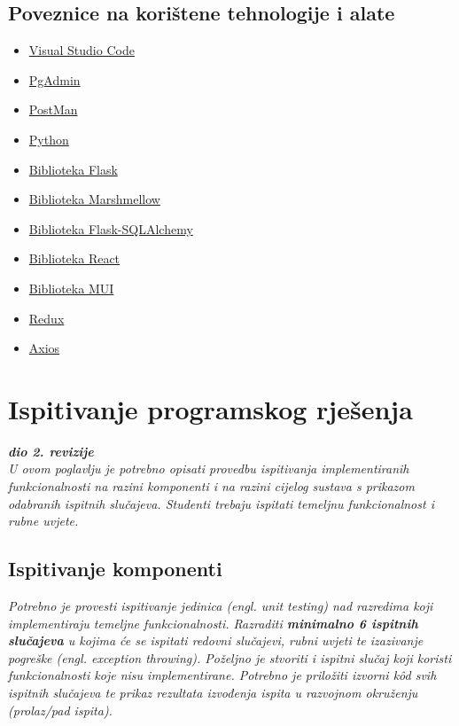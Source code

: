             \subsection{Poveznice na korištene tehnologije i alate}
            \begin{itemize}
                \item \href{https://code.visualstudio.com/}{Visual Studio Code}
                \item \href{https://www.pgadmin.org/}{PgAdmin}
                \item \href{https://www.postman.com/}{PostMan}
                \item \href{https://www.python.org/}{Python}
                \item \href{https://flask.palletsprojects.com/en/3.0.x/}{Biblioteka Flask}
                \item \href{https://marshmallow.readthedocs.io/en/stable/}{Biblioteka Marshmellow}
                \item \href{https://flask-sqlalchemy.palletsprojects.com/en/3.1.x/}{Biblioteka Flask-SQLAlchemy}
                \item \href{https://react.dev/}{Biblioteka React}
                \item \href{https://mui.com/}{Biblioteka MUI}
                \item \href{https://redux.js.org/}{Redux}
                \item \href{https://axios-http.com/docs/intro}{Axios}
              \end{itemize}
			\eject 
		
	
		\section{Ispitivanje programskog rješenja}
			
			\textbf{\textit{dio 2. revizije}}\\
			
			 \textit{U ovom poglavlju je potrebno opisati provedbu ispitivanja implementiranih funkcionalnosti na razini komponenti i na razini cijelog sustava s prikazom odabranih ispitnih slučajeva. Studenti trebaju ispitati temeljnu funkcionalnost i rubne uvjete.}
	
			
			\subsection{Ispitivanje komponenti}
			\textit{Potrebno je provesti ispitivanje jedinica (engl. unit testing) nad razredima koji implementiraju temeljne funkcionalnosti. Razraditi \textbf{minimalno 6 ispitnih slučajeva} u kojima će se ispitati redovni slučajevi, rubni uvjeti te izazivanje pogreške (engl. exception throwing). Poželjno je stvoriti i ispitni slučaj koji koristi funkcionalnosti koje nisu implementirane. Potrebno je priložiti izvorni kôd svih ispitnih slučajeva te prikaz rezultata izvođenja ispita u razvojnom okruženju (prolaz/pad ispita). }
			
